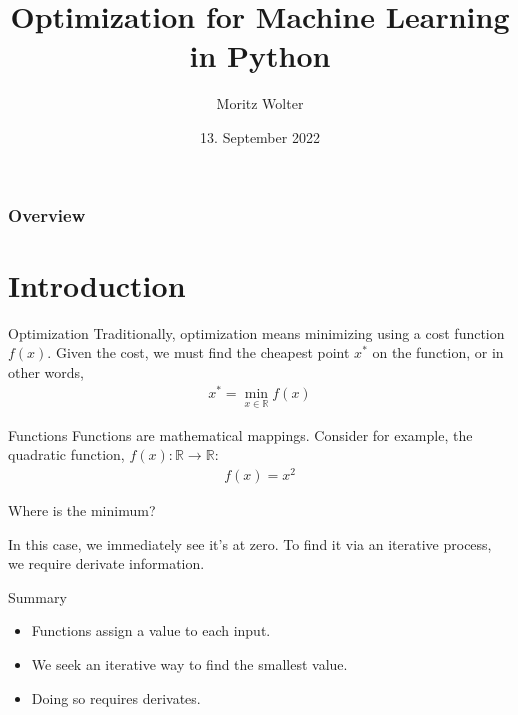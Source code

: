 \documentclass{beamer}
\title{Optimization for Machine Learning in Python}
\institute{High-Performance Computing and Analytics Lab, Uni Bonn}
\author{Moritz Wolter}
\date{13. September 2022}
\begin{document}
    \maketitle

    \begin{frame}
    \frametitle{Overview} 
    \tableofcontents
    \end{frame}

    \section{Introduction}
    \begin{frame}{Optimization}
      Traditionally, optimization means minimizing using a cost function $f(x)$.
      Given the cost, we must find the cheapest point $x^*$ on the function,
      or in other words,
      \begin{align}
       x^* = \min_{x \in \mathbb{R}} f(x)        
      \end{align}
    \end{frame}

    \begin{frame}{Functions}
      Functions are mathematical mappings. Consider for example, the quadratic function,
      $f(x): \mathbb{R} \rightarrow \mathbb{R}$:
      \begin{align}
        f(x) = x^2
      \end{align}

    \begin{figure}
      
    \end{figure}
    \end{frame}

    \begin{frame}{Where is the minimum?}
      \begin{figure}
        
      \end{figure}
      In this case, we immediately see it's at zero. To find it via an iterative process, we require derivate information.
    \end{frame}

    \begin{frame}{Summary}
      \begin{itemize}
        \item Functions assign a value to each input.
        \item We seek an iterative way to find the smallest value.
        \item Doing so requires derivates.
      \end{itemize}
    \end{frame}
\end{document}
